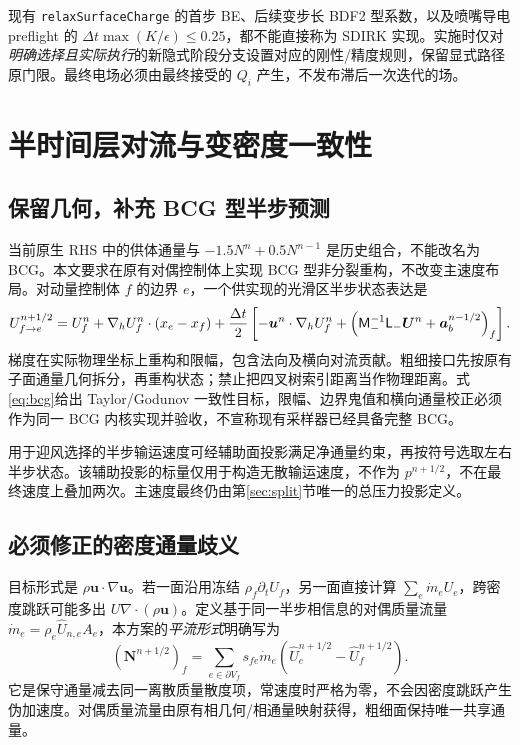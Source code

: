 \documentclass[UTF8,a4paper,11pt,fontset=fandol]{ctexart}
\numberwithin{equation}{section}
\newcommand{\dt}{\Delta t}\newcommand{\dd}{\,\mathrm d}
\newcommand{\uu}{\bm u}\newcommand{\UU}{\bm U}\newcommand{\FF}{\bm F}
\newcommand{\mat}[1]{\mathsf{#1}}\newcommand{\code}[1]{\nolinkurl{#1}}
\begin{document}
现有 \code{relaxSurfaceCharge} 的首步 BE、后续变步长 BDF2 型系数，以及喷嘴导电 preflight 的 $\dt\max(K/\epsilon)\le0.25$，都不能直接称为 SDIRK 实现。实施时仅对\emph{明确选择且实际执行}的新隐式阶段分支设置对应的刚性/精度规则，保留显式路径原门限。最终电场必须由最终接受的 $Q_i$ 产生，不发布滞后一次迭代的场。

\section{半时间层对流与变密度一致性}
\subsection{保留几何，补充 BCG 型半步预测}
当前原生 RHS 中的供体通量与 $-1.5N^n+0.5N^{n-1}$ 是历史组合，不能改名为 BCG。本文要求在原有对偶控制体上实现 BCG 型非分裂重构\cite{bcg}，不改变主速度布局。对动量控制体 $f$ 的边界 $e$，一个供实现的光滑区半步状态表达是
\begin{equation}\label{eq:bcg}
 U_{f\to e}^{n+1/2}=U_f^n+\nabla_hU_f^n\cdot(x_e-x_f)
 +\frac{\dt}{2}\left[-\uu^n\cdot\nabla_hU_f^n
 +\left(\mat M_-^{-1}\mat L_-\UU^n+\acc_b^{n-1/2}\right)_f\right].
\end{equation}
梯度在实际物理坐标上重构和限幅，包含法向及横向对流贡献。粗细接口先按原有子面通量几何拆分，再重构状态；禁止把四叉树索引距离当作物理距离。式\eqref{eq:bcg}给出 Taylor/Godunov 一致性目标，限幅、边界鬼值和横向通量校正必须作为同一 BCG 内核实现并验收，不宣称现有采样器已经具备完整 BCG。

用于迎风选择的半步输运速度可经辅助面投影满足净通量约束，再按符号选取左右半步状态。该辅助投影的标量仅用于构造无散输运速度，不作为 $p^{n+1/2}$，不在最终速度上叠加两次。主速度最终仍由第\ref{sec:split}节唯一的总压力投影定义。

\subsection{必须修正的密度通量歧义}
目标形式是 $\rho\uu\cdot\nabla\uu$。若一面沿用冻结 $\rho_f\partial_tU_f$，另一面直接计算 $\sum_e \dot m_eU_e$，跨密度跳跃可能多出 $U\nabla\cdot(\rho\uu)$。定义基于同一半步相信息的对偶质量流量 $\dot m_e=\rho_e\widehat U_{n,e}A_e$，本方案的\emph{平流形式}明确写为
\begin{equation}\label{eq:adv}
 (\bm N^{n+1/2})_f=\sum_{e\in\partial V_f}s_{fe}\dot m_e
 \left(\widehat U_{e}^{n+1/2}-\widehat U_f^{n+1/2}\right).
\end{equation}
它是保守通量减去同一离散质量散度项，常速度时严格为零，不会因密度跳跃产生伪加速度。对偶质量流量由原有相几何/相通量映射获得，粗细面保持唯一共享通量。
\end{document}

